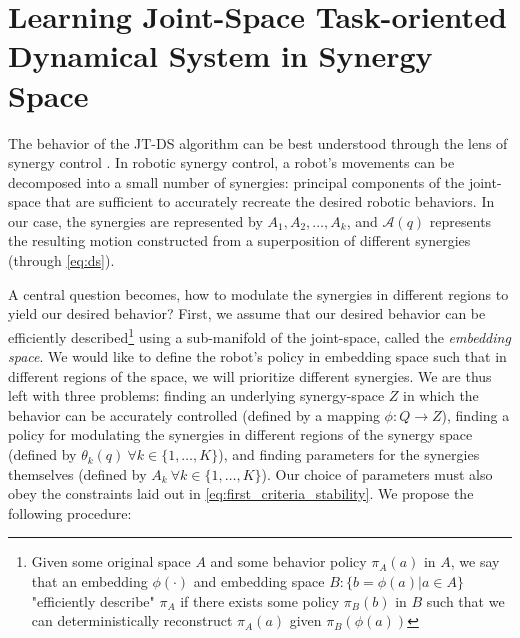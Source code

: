 \documentclass[letterpaper, 10 pt, conference,fleqn]{ieeeconf}
\begin{document}
\section{Learning \textbf{J}oint-Space \textbf{T}ask-oriented \textbf{D}ynamical \textbf{S}ystem in Synergy Space} 
\label{Sec:Learning}

The behavior of the JT-DS algorithm can be best understood through the lens of synergy control \cite{7954741}. In robotic synergy control, a robot's movements can be decomposed into a small number of synergies: principal components of the joint-space that are sufficient to accurately recreate the desired robotic behaviors. In our case, the synergies are represented by $A_1, A_2, \dots, A_k$, and $\mathcal{A}(q)$ represents the resulting motion constructed from a superposition of different synergies (through \eqref{eq:ds}). 

A central question becomes, how to modulate the synergies in different regions to yield our desired behavior? First, we assume that our desired behavior can be efficiently described\footnote{Given some original space $A$ and some behavior policy $\pi_A(a)$ in $A$, we say that an embedding $\phi(\cdot)$ and embedding space $B: \{b = \phi(a) | a \in A\}$ "efficiently describe" $\pi_A$ if there exists some policy $\pi_B(b)$ in $B$ such that we can deterministically reconstruct $\pi_A(a)$ given $\pi_B(\phi(a))$} using a sub-manifold of the joint-space, called the \emph{embedding space}. We would like to define the robot's policy in embedding space such that in different regions of the space, we will prioritize different synergies. We are thus left with three problems: finding an underlying synergy-space $Z$ in which the behavior can be accurately controlled (defined by a mapping $\phi: Q \rightarrow Z$), finding a policy for modulating the synergies in different regions of the synergy space (defined by $\theta_k(q)~\forall k\in\{1,\dots,K\}$), and finding parameters for the synergies themselves (defined by $A_k~\forall k\in\{1,\dots,K\}$). Our choice of parameters must also obey the constraints laid out in \eqref{eq:first_criteria_stability}. We propose the following procedure:
\end{document}
